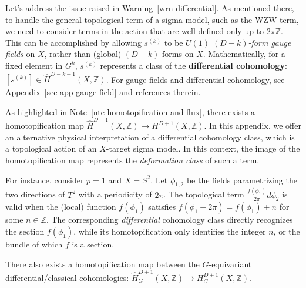 \documentclass[
  letterpaper,
  DIV=11,
  numbers=noendperiod]{scrreport}
\begin{document}
Let's address the issue raised in Warning~\ref{wrn-differential}. As
mentioned there, to handle the general topological term of a sigma
model, such as the WZW term, we need to consider terms in the action
that are well-defined only up to \(2\pi \mathbb{Z}\). This can be
accomplished by allowing \(s^{(k)}\) to be \emph{\(U(1)\) \((D-k)\)-form
gauge fields} on \(X\), rather than (global) \((D-k)\)-forms on \(X\).
Mathematically, for a fixed element in \(G^k\), \(s^{(k)}\) represents a
class of the \textbf{differential cohomology}:
\([s^{(k)}]\in\hat{H}^{D-k+1}(X,\mathbb{Z})\). For gauge fields and
differential cohomology, see Appendix~\ref{sec-app-gauge-field} and
references therein.

\begin{tcolorbox}[enhanced jigsaw, opacityback=0, opacitybacktitle=0.6, leftrule=.75mm, arc=.35mm, coltitle=black, breakable, colframe=quarto-callout-note-color-frame, titlerule=0mm, colback=white, bottomrule=.15mm, left=2mm, colbacktitle=quarto-callout-note-color!10!white, toptitle=1mm, bottomtitle=1mm, title=\textcolor{quarto-callout-note-color}{\faInfo}\hspace{0.5em}{Homotopification and deformation classes}, rightrule=.15mm, toprule=.15mm]

As highlighted in Note~\ref{nte-homotopification-and-flux}, there exists
a homotopification map
\(\hat{H}^{D+1}(X,\mathbb{Z}) \to H^{D+1}(X,\mathbb{Z})\). In this
appendix, we offer an alternative physical interpretation of a
differential cohomology class, which is a topological action of an
\(X\)-target sigma model. In this context, the image of the
homotopification map represents the \emph{deformation class} of such a
term.

For instance, consider \(p=1\) and \(X=S^2\). Let \(\phi_{1,2}\) be the
fields parametrizing the two directions of \(T^2\) with a periodicity of
\(2\pi\). The topological term \(\frac{f(\phi_1)}{2\pi}d\phi_2\) is
valid when the (local) function \(f(\phi_1)\) satisfies
\(f(\phi_1+2\pi) = f(\phi_1) + n\) for some \(n \in \mathbb{Z}\). The
corresponding \emph{differential} cohomology class directly recognizes
the section \(f(\phi_1)\), while its homotopification only identifies
the integer \(n\), or the bundle of which \(f\) is a section.

There also exists a homotopification map between the \(G\)-equivariant
differential/classical cohomologies:
\(\hat{H}^{D+1}_G(X,\mathbb{Z}) \to H^{D+1}_G(X,\mathbb{Z})\).

\end{tcolorbox}
\end{document}
